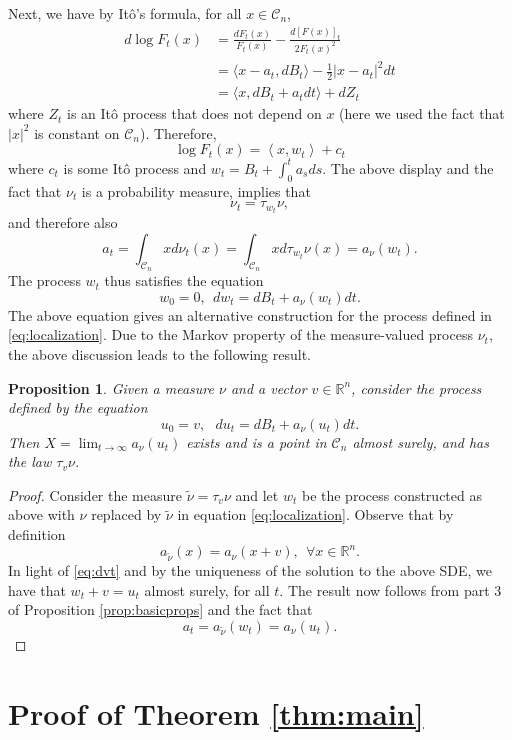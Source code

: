 \documentclass[12pt]{article}
\def \RR {\mathbb R}
\def \DC {\mathcal{C}_n}
\newtheorem{proposition}[theorem]{Proposition}
\theoremstyle{definition}
\theoremstyle{remark}
\begin{document}
Next, we have by It\^o's formula, for all $x \in \DC$,
\begin{align}
d \log F_t(x) & = \frac{d F_t(x)}{F_t(x)} - \frac{d[F(x)]_t}{2 F_t(x)^2} \nonumber \\
& = \langle x-a_t, d B_t \rangle - \frac{1}{2}  |x-a_t|^2 dt \nonumber \\
& = \langle x, d B_t + a_t dt \rangle + d Z_t
\end{align}
where $Z_t$ is an It\^o process that does not depend on $x$ (here we used the fact that $|x|^2$ is constant on $\DC$). Therefore,
$$
\log F_t(x) = \left \langle x, w_t  \right \rangle + c_t
$$
where $c_t$ is some It\^o process and $w_t = B_t + \int_0^t a_s ds$. The above display and the fact that $\nu_t$ is a probability measure, implies that
\begin{equation}\label{eq:tilts}
\nu_t = \tau_{w_t} \nu,
\end{equation}
and therefore also 
$$
a_t = \int_{\DC} x d \nu_t(x) = \int_{\DC} x d \tau_{w_t} \nu(x) = a_\nu(w_t).
$$ 
The process $w_t$ thus satisfies the equation
\begin{equation}\label{eq:dvt}
w_0 = 0, ~~ d w_t = d B_t + a_\nu(w_t) dt.
\end{equation}
The above equation gives an alternative construction for the process defined in \eqref{eq:localization}. Due to the Markov property of the measure-valued process $\nu_t$, the above discussion leads to the following result.
\begin{proposition} \label{prop:alt}
Given a measure $\nu$ and a vector $v \in \RR^n$, consider the process defined by the equation
$$
u_0 = v, ~~~ d u_t = d B_t + a_\nu(u_t) dt.
$$
Then $X = \lim_{t \to \infty} a_\nu(u_t)$ exists and is a point in $\DC$ almost surely, and has the law $\tau_{v} \nu$. 
\end{proposition}
\begin{proof}
Consider the measure $\tilde \nu = \tau_{v} \nu$ and let $w_t$ be the process constructed as above with $\nu$ replaced by $\tilde \nu$ in equation \eqref{eq:localization}. Observe that by definition 
$$
a_{\tilde \nu}(x) = a_\nu(x + v), ~~ \forall x \in \RR^n.
$$	
In light of \eqref{eq:dvt} and by the uniqueness of the solution to the above SDE, we have that $w_t + v = u_t$ almost surely, for all $t$. The result now follows from part 3 of Proposition \ref{prop:basicprops} and the fact that 
$$
a_t = a_{\tilde \nu}(w_t) = a_\nu(u_t).
$$
\end{proof}

\section{Proof of Theorem \ref{thm:main}}
\end{document}
